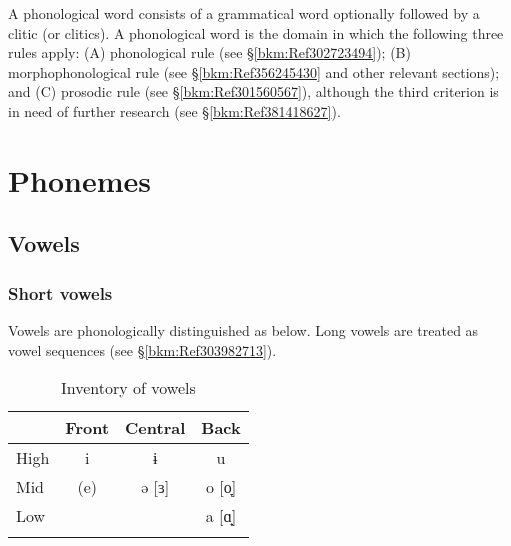 \noindent A phonological word consists of a grammatical word optionally followed by a clitic (or clitics). A phonological word is the domain in which the following three rules apply: (A) phonological rule (see §\ref{bkm:Ref302723494}); (B) morphophonological rule (see §\ref{bkm:Ref356245430} and other relevant sections); and (C) prosodic rule (see §\ref{bkm:Ref301560567}), although the third criterion is in need of further research (see §\ref{bkm:Ref381418627}).

\section{Phonemes}
\label{bkm:Ref381193872}\hypertarget{RefHeadingToc395696962}{}\label{bkm:Ref347174415}\subsection{Vowels}
\label{bkm:Ref312504424}\hypertarget{RefHeadingToc395696963}{}\subsubsection{Short vowels}
\hypertarget{RefHeadingToc395696964}{}
Vowels are phonologically distinguished as below. Long vowels are treated as vowel sequences (see §\ref{bkm:Ref303982713}).

\begin{table}
\caption{Inventory of vowels}
\begin{tabular}{lccc} 
\lsptoprule
     & Front & Central & Back\\
     \midrule
High &  i    & ɨ       & u\\
Mid  & (e)   & ə [ɜ]   & o [o̞]\\
Low  &       &         & a [ɑ̟]\\
\lspbottomrule
\end{tabular}
\end{table}

